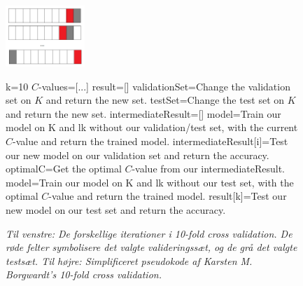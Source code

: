 \documentclass{article}
\begin{document}
\begin{figure}[H]
	\begin{minipage}{0.3\linewidth}
		\includegraphics[width=3cm]{10-fold-cross-validation_3}
	\end{minipage}
	\begin{minipage}{1\linewidth}
		\scriptsize
		\begin{algorithmic}[1]
				\State k=10
				\State $C$-values=[...]
				\State result=[]
					\State validationSet=Change the validation set on $K$ and return the new set.
					\State testSet=Change the test set on $K$ and return the new set.
					\State intermediateResult=[]
						\State model=Train our model on K and lk without our validation/test set, with the current $C$-value and return the trained model.
						\State intermediateResult[i]=Test our new model on our validation set and return the accuracy.
					\EndFor
					\State optimalC=Get the optimal $C$-value from our intermediateResult.
					\State model=Train our model on K and lk without our test set, with the optimal $C$-value and return the trained model.
					\State result[k]=Test our new model on our test set and return the accuracy.
				\EndFor
				\State {}
			\EndFunction
		\end{algorithmic}
	\end{minipage}
\caption{\textit{Til venstre: De forskellige iterationer i 10-fold cross validation. De røde felter symbolisere det valgte valideringssæt, og de grå det valgte testsæt. Til højre: Simplificeret pseudokode af Karsten M. Borgwardt's 10-fold cross validation.}}
\label{fig:cross_validation}
\end{figure}
\end{document}
